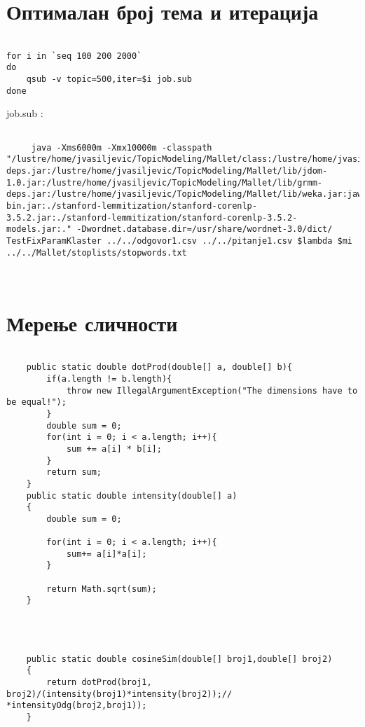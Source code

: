 \section{Оптималан број тема и итерација}

\begin{lstlisting}

for i in `seq 100 200 2000` 
do
	qsub -v topic=500,iter=$i job.sub	
done

\end{lstlisting}

job.sub	:

\begin{lstlisting}

	 java -Xms6000m -Xmx10000m -classpath "/lustre/home/jvasiljevic/TopicModeling/Mallet/class:/lustre/home/jvasiljevic/TopicModeling/Mallet/lib/mallet-deps.jar:/lustre/home/jvasiljevic/TopicModeling/Mallet/lib/jdom-1.0.jar:/lustre/home/jvasiljevic/TopicModeling/Mallet/lib/grmm-deps.jar:/lustre/home/jvasiljevic/TopicModeling/Mallet/lib/weka.jar:jaws-bin.jar:./stanford-lemmitization/stanford-corenlp-3.5.2.jar:./stanford-lemmitization/stanford-corenlp-3.5.2-models.jar:." -Dwordnet.database.dir=/usr/share/wordnet-3.0/dict/  TestFixParamKlaster ../../odgovor1.csv ../../pitanje1.csv $lambda $mi ../../Mallet/stoplists/stopwords.txt
	 
	 
\end{lstlisting}





\section{Мерење сличности}

\begin{lstlisting}

	public static double dotProd(double[] a, double[] b){
		if(a.length != b.length){
			throw new IllegalArgumentException("The dimensions have to be equal!");
		}
		double sum = 0;
		for(int i = 0; i < a.length; i++){
			sum += a[i] * b[i];
		}
		return sum;
	}
	public static double intensity(double[] a)
	{
		double sum = 0;
	
		for(int i = 0; i < a.length; i++){
			sum+= a[i]*a[i];
		}
		
		return Math.sqrt(sum);
	}
	


	
	public static double cosineSim(double[] broj1,double[] broj2)
	{
		return dotProd(broj1, broj2)/(intensity(broj1)*intensity(broj2));// *intensityOdg(broj2,broj1));
	}
\end{lstlisting}

